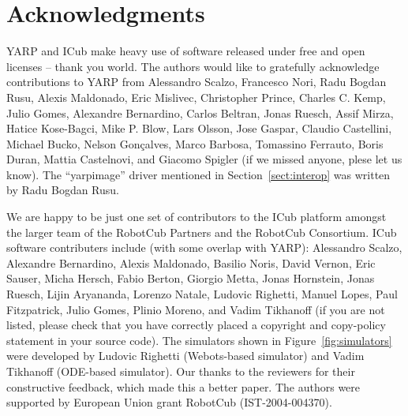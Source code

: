 
\section{Acknowledgments}

YARP and ICub make heavy use of software released under free and open
licenses -- thank you world.
%
The authors would like to gratefully acknowledge contributions to YARP
from Alessandro Scalzo, Francesco Nori, Radu Bogdan Rusu, 
Alexis Maldonado, Eric Mislivec, Christopher
Prince, Charles C. Kemp, Julio Gomes, Alexandre
Bernardino, Carlos Beltran, Jonas Ruesch, Assif Mirza, Hatice
Kose-Bagci, Mike P. Blow, Lars Olsson,
Jose Gaspar, Claudio Castellini, Michael Bucko, Nelson
Gon\c calves, Marco Barbosa, Tomassino Ferrauto, Boris Duran, Mattia
Castelnovi, and Giacomo Spigler 
 (if we missed anyone, plese let us
know).  
%
The ``yarpimage'' driver mentioned in Section~\ref{sect:interop}
was written by Radu Bogdan Rusu.

We are happy to be just one set of contributors to the ICub platform
amongst the larger team of the RobotCub Partners and the RobotCub
Consortium.
%
ICub software contributers include (with some overlap with YARP):
Alessandro Scalzo, Alexandre Bernardino, Alexis Maldonado, Basilio
Noris, David Vernon, Eric Sauser, Micha Hersch, Fabio Berton, Giorgio
Metta, Jonas Hornstein, Jonas Ruesch, Lijin Aryananda, Lorenzo Natale,
Ludovic Righetti, Manuel Lopes, Paul Fitzpatrick, Julio Gomes, Plinio
Moreno, and Vadim Tikhanoff (if you are not listed, please check that
you have correctly placed a copyright and copy-policy statement in
your source code).
%
%
The simulators shown in Figure~\ref{fig:simulators} were developed 
by Ludovic Righetti (Webots-based simulator) and
Vadim Tikhanoff (ODE-based simulator).
%
Our thanks to the reviewers for their constructive feedback, which
made this a better paper.
%
The authors were supported by European Union
grant RobotCub (IST-2004-004370).




